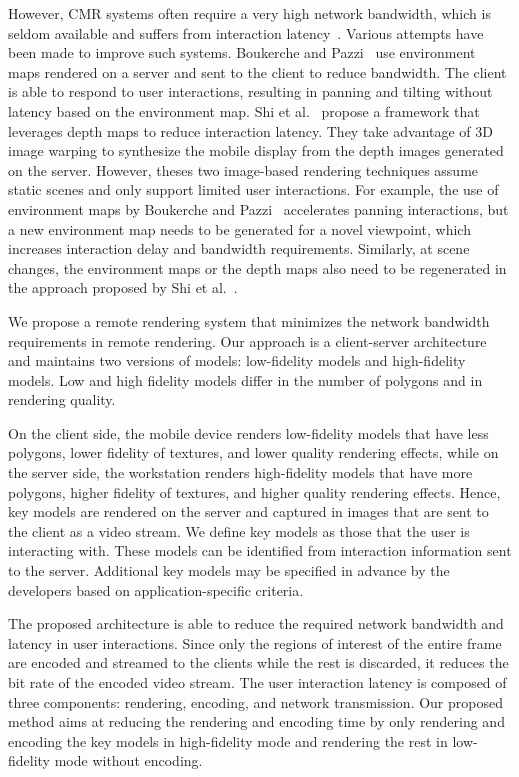 However, CMR systems often require a very high network bandwidth, which is seldom available and suffers from interaction latency~\cite{chen2014}. Various attempts have been made to improve such systems. 
Boukerche and Pazzi~\cite{boukerche2006} use environment maps rendered on a server and sent to the client to reduce bandwidth. The client is able to respond to user interactions, resulting in panning and tilting without latency based on the environment map.
Shi et al.~\cite{shi2012} propose a framework that leverages depth maps to reduce interaction latency. They take advantage of 3D image warping to synthesize the mobile display from the depth images generated on the server.
However, theses two image-based rendering techniques assume static scenes and only support limited user interactions.
For example, the use of environment maps by Boukerche and Pazzi~\cite{boukerche2006} accelerates panning interactions, but a new environment map needs to be generated for a novel viewpoint, which increases interaction delay and bandwidth requirements. Similarly, at scene changes, the environment maps or the depth maps also need to be regenerated in the approach proposed by Shi et al.~\cite{shi2012}.

We propose a remote rendering system that minimizes the network bandwidth requirements in remote rendering.
Our approach is a client-server architecture and maintains two versions of models: low-fidelity models and high-fidelity models.
Low and high fidelity models differ in the number of polygons and in rendering quality.

On the client side, the mobile device renders low-fidelity models that have less polygons, lower fidelity of textures, and lower quality rendering effects, while on the server side, the workstation renders high-fidelity models that have more polygons, higher fidelity of textures, and higher quality rendering effects. Hence, key models are rendered on the server and captured in images that are sent to the client as a video stream. We define key models as those that the user is interacting with. These models can be identified from interaction information sent to the server. Additional key models may be specified in advance by the developers based on application-specific criteria.

The proposed architecture is able to reduce the required network bandwidth and latency in user interactions.
Since only the regions of interest of the entire frame are encoded and streamed to the clients while the rest is discarded, it reduces the bit rate of the encoded video stream.
The user interaction latency is composed of three components: rendering, encoding, and network transmission. Our proposed method aims at reducing the rendering and encoding time by only rendering and encoding the key models in high-fidelity mode and rendering the rest in low-fidelity mode without encoding.

